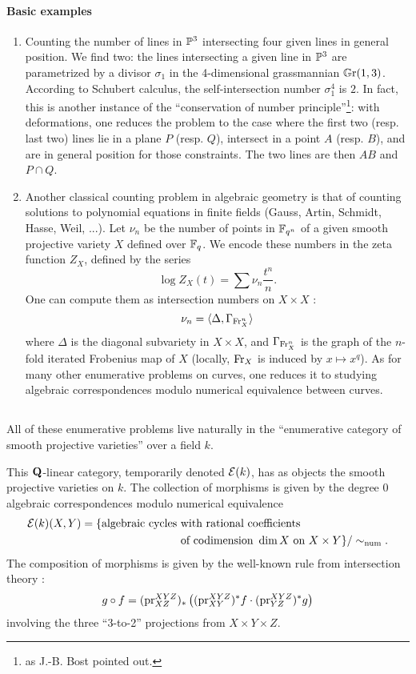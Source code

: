 \documentclass[../main.tex]{subfiles}
\begin{document}
\paragraph*{Basic examples}
\begin{enumerate}
    \item Counting the number of lines in $\P^3$ intersecting four given lines in general position. We find two: the lines intersecting a given line in $\P^3$ are parametrized by a divisor $\sigma_1$ in the 4-dimensional grassmannian $\Gr(1, 3)$.
    According to Schubert calculus, the self-intersection number $\sigma_1^4$ is $2$.
    In fact, this is another instance of the \enquote{conservation of number principle}\footnote{as J.-B. Bost pointed out.}: with deformations, one reduces the problem to the case where the first two (resp. last two) lines lie in a plane $P$ (resp. $Q$), intersect in a point $A$ (resp. $B$), and are in general position for those constraints.
    The two lines are then $AB$ and $P \cap Q$.
    
    \item Another classical counting problem in algebraic geometry is that of counting solutions to polynomial equations in finite fields (Gauss, Artin, Schmidt, Hasse, Weil, ...). Let $\nu_n$ be the number of points in $\F_{q^n}$ of a given smooth projective variety $X$ defined over $\F_q$. We encode these numbers in the zeta function $Z_X$, defined by the series
    $$\log Z_X(t) = \sum \nu_n \frac{t^n}{n}.$$
    One can compute them as intersection numbers on $X \times X$ :
    $$\nu_n = \langle \Delta, \Gamma_{\Fr_X^n} \rangle$$
    where $\Delta$ is the diagonal subvariety in $X \times X$, and $\Gamma_{\Fr_X^n}$ is the graph of the $n$-fold iterated Frobenius map of $X$ (locally, $\Fr_X$ is induced by $x \mapsto x^q$).
    As for many other enumerative problems on curves, one reduces it to studying algebraic correspondences modulo numerical equivalence between curves.
\end{enumerate}

\subsection{} All of these enumerative problems live naturally in the \enquote{enumerative category of smooth projective varieties} over a field $k$.

This $\Q$-linear category, temporarily denoted $\E(k)$, has as objects the smooth projective varieties on $k$.
The collection of morphisms is given by the degree $0$ algebraic correspondences modulo numerical equivalence
\begin{align*}
    \E(k)(X, Y) = \{\text{algebraic cycles }&\text{with rational coefficients}\\
    &\text{of codimension }\dim X\text{ on }X \times Y\} / \sim_{\num}.
\end{align*}
The composition of morphisms is given by the well-known rule from intersection theory :
$$g \circ f = (\pr^{XYZ}_{XZ})_* \left((\pr^{XYZ}_{XY})^* f \cdot (\pr^{XYZ}_{YZ})^* g\right)$$
involving the three \enquote{3-to-2} projections from $X \times Y \times Z$.
\end{document}
